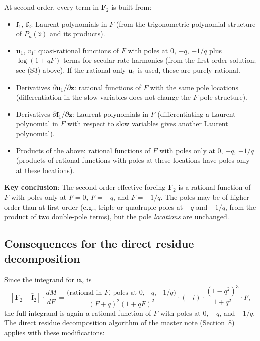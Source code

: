 \documentclass[11pt]{article}
\begin{document}
At second order, every term in $\bm F_2$ is built from:
\begin{itemize}
\item $\bm f_1$, $\bm f_2$: Laurent polynomials in $F$ (from the
trigonometric-polynomial structure of $P_n(\hat z)$ and its products).
\item $\bm u_1$, $v_1$: quasi-rational functions of $F$ with poles at $0$,
$-q$, $-1/q$ plus $\log(1+qF)$ terms for secular-rate harmonics
(from the first-order solution; see (S3) above).  If the rational-only
$\bm u_1$ is used, these are purely rational.
\item Derivatives $\partial \bm u_1/\partial \bar{\bm z}$: rational functions
of $F$ with the same pole locations (differentiation in the slow variables
does not change the $F$-pole structure).
\item Derivatives $\partial \bm f_1/\partial \bm z$: Laurent polynomials in
$F$ (differentiating a Laurent polynomial in $F$ with respect to slow
variables gives another Laurent polynomial).
\item Products of the above: rational functions of $F$ with poles only at
$0$, $-q$, $-1/q$ (products of rational functions with poles at these
locations have poles only at these locations).
\end{itemize}

\textbf{Key conclusion}: The second-order effective forcing $\bm F_2$ is a
rational function of $F$ with poles only at $F = 0$, $F = -q$, and
$F = -1/q$. The poles may be of higher order than at first order (e.g.,
triple or quadruple poles at $-q$ and $-1/q$, from the product of two
double-pole terms), but the pole \emph{locations} are unchanged.

\subsection{Consequences for the direct residue decomposition}

Since the integrand for $\bm u_2$ is
\begin{equation}
\left[\bm F_2 - \bar{\bm f}_2\right] \cdot \frac{dM}{dF}
= \frac{\text{(rational in } F\text{, poles at } 0, -q, -1/q\text{)}}
       {(F+q)^2(1+qF)^2}
\cdot (-i) \cdot \frac{(1-q^2)^3}{1+q^2} \cdot F,
\end{equation}
the full integrand is again a rational function of $F$ with poles at $0$,
$-q$, and $-1/q$. The direct residue decomposition algorithm of the master
note (Section~8) applies with these modifications:
\end{document}
